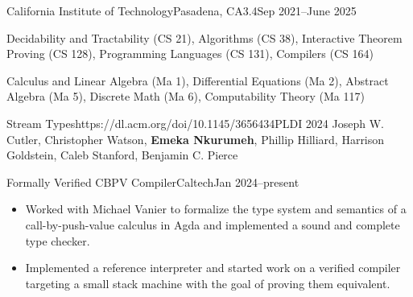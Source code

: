 \documentclass[a4paper,10pt]{article}
\begin{document}

    \begin{school}{California Institute of Technology}{Pasadena, CA}{3.4}{Sep 2021--June 2025}


        \item Decidability and Tractability (CS 21), Algorithms (CS 38), Interactive Theorem Proving (CS 128), Programming Languages (CS 131), Compilers (CS 164)
        \item Calculus and Linear Algebra (Ma 1), Differential Equations (Ma 2), Abstract Algebra (Ma 5), Discrete Math (Ma 6), Computability Theory (Ma 117)

    \end{school}

    \begin{publication}{Stream Types}{https://dl.acm.org/doi/10.1145/3656434}{PLDI 2024}
      Joseph W. Cutler, Christopher Watson, \textbf{Emeka Nkurumeh}, Phillip Hilliard, Harrison Goldstein, Caleb Stanford, Benjamin C. Pierce
    \end{publication}

    \begin{activity*}{Formally Verified CBPV Compiler}{Caltech}{Jan 2024--present}
      \begin{itemize}[topsep=5pt, partopsep=0pt, itemsep=-1pt]
        \item Worked with Michael Vanier to formalize the type system and semantics of a call-by-push-value calculus in Agda and implemented a sound and complete type checker.
        \item Implemented a reference interpreter and started work on a verified compiler targeting a small stack machine with the goal of proving them equivalent.
      \end{itemize}
    \end{activity*}
\end{document}
